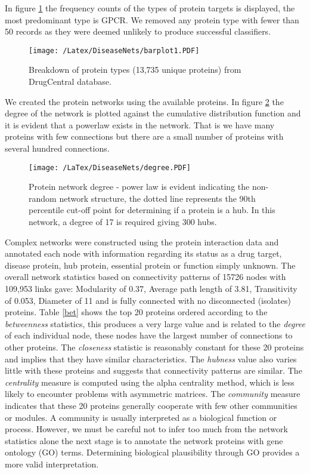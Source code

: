 \documentclass[a4paper,8pt,twocolumn,5p]{elsarticle}
\begin{document}
In figure \ref{barplot1} the frequency counts of the types of protein targets is displayed, the most predominant type is GPCR. We removed any protein type with fewer than 50 records as they were deemed unlikely to produce successful classifiers.  

\begin{figure}[h]
\centering
 \texttt{[image: /Latex/DiseaseNets/barplot1.PDF]} %
\centering \caption{Breakdown of protein types (13,735 unique proteins) from DrugCentral database. }
\label{barplot1}
\end{figure}

We created the protein networks using the available proteins. In figure \ref{powerlaw} the degree of the network is plotted against the cumulative distribution function and it is evident that a powerlaw exists in the network. That is we have many proteins with few connections but there are a small number of proteins with several hundred connections.

\begin{figure}[h]
\centering
\texttt{[image: /LaTex/DiseaseNets/degree.PDF]} %
\centering \caption{Protein network degree - power law is evident indicating the non-random network structure, the dotted line represents the 90th percentile cut-off point for determining if a protein is a hub. In this network, a degree of 17 is required giving 300 hubs.}
\label{powerlaw}
\end{figure}

Complex networks were constructed using the protein interaction data and annotated each node with information regarding its status as a drug target, disease protein, hub protein, essential protein or function simply unknown. The overall network statistics based on connectivity patterns of 15726 nodes with 109,953 links gave: Modularity  of 0.37, Average path length of 3.81,  Transitivity  of 0.053, Diameter  of 11 and is fully connected with no disconnected (isolates) proteins. Table \ref{bet} shows the top 20 proteins ordered according to the {\it betweenness} statistics, this produces a very large value and is related to the {\it degree } of each individual node, these nodes have the largest number of connections to other proteins. The {\it  closeness} statistic is reasonably constant for these 20 proteins and implies that they have similar characteristics. The {\it hubness} value also varies little with these proteins and suggests that connectivity patterns are similar. The {\it centrality} measure is computed using the alpha centrality method, which is less likely to encounter problems with asymmetric matrices. The {\it community} measure indicates that these 20 proteins generally cooperate with few other communities or modules. A community is usually interpreted as a biological function or process. However, we must be careful not to infer too much from the network statistics alone the next stage is to annotate the network proteins with gene ontology (GO) terms. Determining biological plausibility through GO provides a more valid interpretation.
\end{document}
